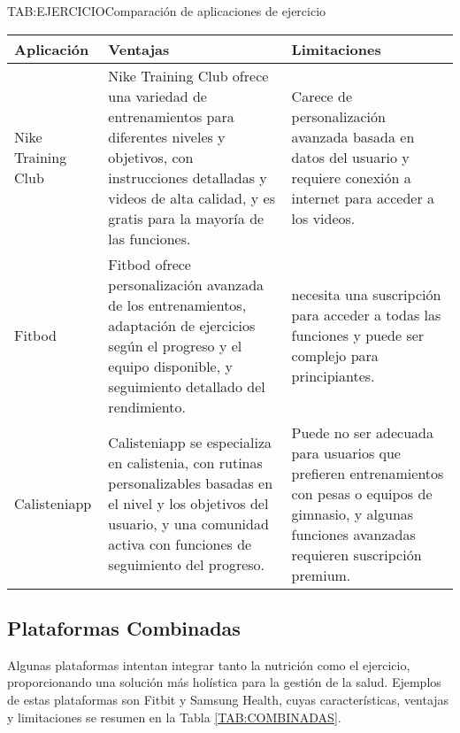\begin{table}[Comparación de aplicaciones de ejercicio]{TAB:EJERCICIO}{Comparación de aplicaciones de ejercicio}
  \begin{tabular}{|p{3cm}|p{5cm}|p{5cm}|}
    \hline
    \textbf{Aplicación} & \textbf{Ventajas} & \textbf{Limitaciones} \\
    \hline
    Nike Training Club & Nike Training Club ofrece una variedad de entrenamientos para diferentes niveles y objetivos, con instrucciones detalladas y videos de alta calidad, y es gratis para la mayoría de las funciones. & Carece de personalización avanzada basada en datos del usuario y requiere conexión a internet para acceder a los videos. \\
    \hline
    Fitbod & Fitbod ofrece personalización avanzada de los entrenamientos, adaptación de ejercicios según el progreso y el equipo disponible, y seguimiento detallado del rendimiento. & necesita una suscripción para acceder a todas las funciones y puede ser complejo para principiantes. \\
    \hline
    Calisteniapp & Calisteniapp se especializa en calistenia, con rutinas personalizables basadas en el nivel y los objetivos del usuario, y una comunidad activa con funciones de seguimiento del progreso. & Puede no ser adecuada para usuarios que prefieren entrenamientos con pesas o equipos de gimnasio, y algunas funciones avanzadas requieren suscripción premium. \\
    \hline
  \end{tabular}
\end{table}

\subsection{Plataformas Combinadas}

Algunas plataformas intentan integrar tanto la nutrición como el ejercicio, proporcionando una solución más holística para la gestión de la salud. Ejemplos de estas plataformas son Fitbit y Samsung Health, cuyas características, ventajas y limitaciones se resumen en la Tabla \ref{TAB:COMBINADAS}.


